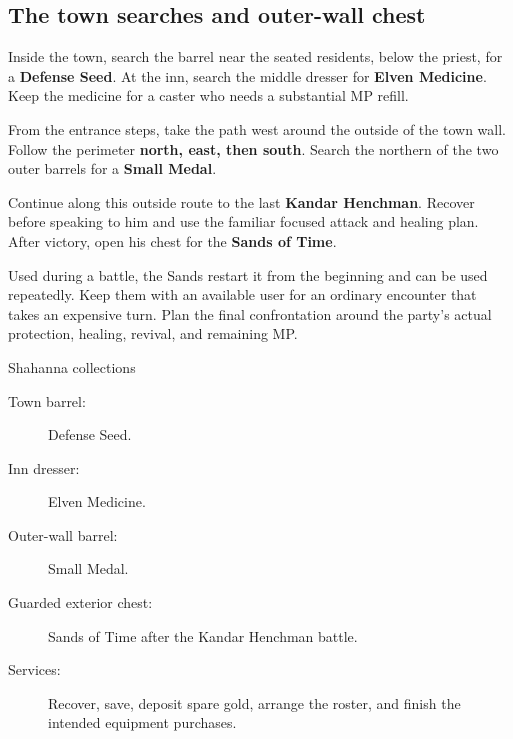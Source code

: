 \subsection*{The town searches and outer-wall chest}

Inside the town, search the barrel near the seated residents,
below the priest, for a \textbf{Defense Seed}. At the inn,
search the middle dresser for \textbf{Elven Medicine}.
Keep the medicine for a caster who needs a substantial MP refill.

From the entrance steps, take the path west around the outside
of the town wall. Follow the perimeter \textbf{north, east,
then south}. Search the northern of the two outer barrels
for a \textbf{Small Medal}.


Continue along this outside route to the last
\textbf{Kandar Henchman}. Recover before speaking to him
and use the familiar focused attack and healing plan.
After victory, open his chest for the \textbf{Sands of Time}.


Used during a battle, the Sands restart it from the beginning
and can be used repeatedly. Keep them with an available user
for an ordinary encounter that takes an expensive turn.
Plan the final confrontation around the party's actual
protection, healing, revival, and remaining MP.

\begin{routecheck}{Shahanna collections}
\begin{description}
  \item[Town barrel:] Defense Seed.
  \item[Inn dresser:] Elven Medicine.
  \item[Outer-wall barrel:] Small Medal.
  \item[Guarded exterior chest:] Sands of Time after the
    Kandar Henchman battle.
  \item[Services:] Recover, save, deposit spare gold, arrange
    the roster, and finish the intended equipment purchases.
\end{description}
\end{routecheck}

